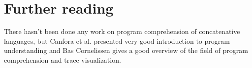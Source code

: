 \section{Further reading}

There hasn't been done any work on program comprehension of concatenative languages, but Canfora et al.\cite{Canfora:2011:ACS:1924421.1924451} presented very good introduction to program understanding and Bas Cornelissen\cite{Cornelissen2009} gives a good overview of the field of program comprehension and trace visualization.